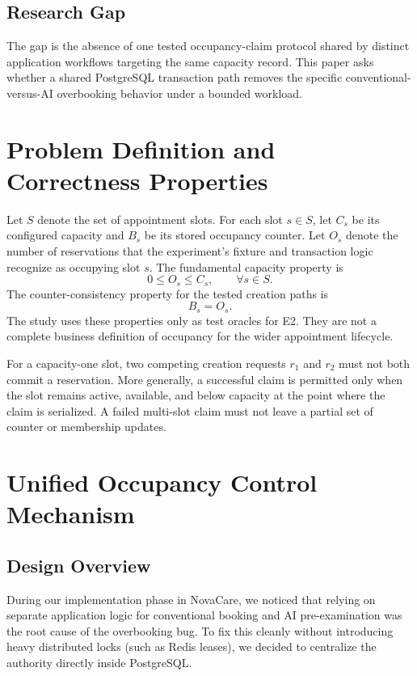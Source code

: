 \documentclass[conference]{IEEEtran}
\begin{document}
\subsection{Research Gap}
The gap is the absence of one tested occupancy-claim protocol shared by distinct application workflows targeting the same capacity record. This paper asks whether a shared PostgreSQL transaction path removes the specific conventional-versus-AI overbooking behavior under a bounded workload.

\section{Problem Definition and Correctness Properties}
Let $S$ denote the set of appointment slots. For each slot $s\in S$, let $C_s$ be its configured capacity and $B_s$ be its stored occupancy counter. Let $O_s$ denote the number of reservations that the experiment's fixture and transaction logic recognize as occupying slot $s$. The fundamental capacity property is
\begin{equation}
0 \leq O_s \leq C_s, \qquad \forall s\in S.
\label{eq:capacity}
\end{equation}
The counter-consistency property for the tested creation paths is
\begin{equation}
B_s = O_s.
\label{eq:counter}
\end{equation}
The study uses these properties only as test oracles for E2. They are not a complete business definition of occupancy for the wider appointment lifecycle.

For a capacity-one slot, two competing creation requests $r_1$ and $r_2$ must not both commit a reservation. More generally, a successful claim is permitted only when the slot remains active, available, and below capacity at the point where the claim is serialized. A failed multi-slot claim must not leave a partial set of counter or membership updates.

\section{Unified Occupancy Control Mechanism}
\subsection{Design Overview}
During our implementation phase in NovaCare, we noticed that relying on separate application logic for conventional booking and AI pre-examination was the root cause of the overbooking bug. To fix this cleanly without introducing heavy distributed locks (such as Redis leases), we decided to centralize the authority directly inside PostgreSQL.
\end{document}
